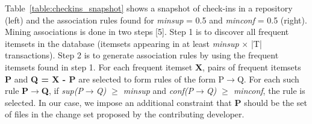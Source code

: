 Table~\ref{table:checkins_snapshot} shows a snapshot of check-ins in a repository (left) and the association rules found for \textit{minsup} = 0.5 and \textit{minconf} = 0.5 (right). Mining associations is done in two steps [5]. Step 1 is to discover all frequent itemsets in the database (itemsets appearing in at least \textit{minsup} $\times$ |T| transactions). Step 2 is to generate association rules by using the frequent itemsets found in step 1. For each frequent itemset \textbf{X}, pairs of frequent itemsets \textbf{P} and \textbf{Q = X - P} are selected to form rules of the form P$\rightarrow$Q. For each such rule \textbf{P$\rightarrow$Q}, if \textit{sup(P$\rightarrow$Q) $\ge$ minsup} and \textit{conf(P$\rightarrow$Q) $\ge$ minconf}, the rule is selected. In our case, we impose an additional constraint that \textbf{P} should be the set of files in the change set proposed by the contributing developer.

\begin{table}[htbp]
  \centering
  \caption{}
  \hspace{1cm}
  \label{table:checkins_snapshot}
\end{table}


